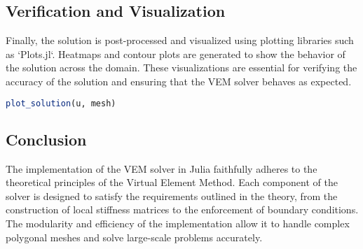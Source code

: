 \documentclass[class=article, crop=false]{standalone}
\begin{document}
\subsection{Verification and Visualization}

Finally, the solution is post-processed and visualized using plotting libraries such as `Plots.jl`. Heatmaps and contour plots are generated to show the behavior of the solution across the domain. These visualizations are essential for verifying the accuracy of the solution and ensuring that the VEM solver behaves as expected.

\begin{lstlisting}[language=Julia, caption={Plotting the Solution}]
plot_solution(u, mesh)
\end{lstlisting}

\subsection{Conclusion}

The implementation of the VEM solver in Julia faithfully adheres to the theoretical principles of the Virtual Element Method. Each component of the solver is designed to satisfy the requirements outlined in the theory, from the construction of local stiffness matrices to the enforcement of boundary conditions. The modularity and efficiency of the implementation allow it to handle complex polygonal meshes and solve large-scale problems accurately.
\end{document}
